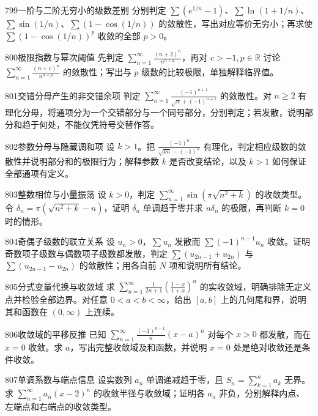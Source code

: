 \begin{exercise}{799}{一阶与二阶无穷小的级数差别}
分别判定 $\sum(e^{1/n}-1)$、$\sum\ln(1+1/n)$、$\sum\sin(1/n)$、$\sum(1-\cos(1/n))$ 的敛散性，写出对应等价无穷小；再求使 $\sum(1-\cos(1/n))^p$ 收敛的全部 $p>0$。
\end{exercise}
\begin{exercise}{800}{极限指数与幂次阈值}
先判定 $\sum_{n=1}^{\infty}\frac{(n+2)^n}{n^{n+2}}$，再对 $c>-1,p\in\mathbb R$ 讨论 $\sum_{n=1}^{\infty}\frac{(n+c)^n}{n^{n+p}}$ 的敛散性；写出与 $p$ 级数的比较极限，单独解释临界值。
\end{exercise}
\begin{exercise}{801}{交错分母产生的非交错余项}
判定 $\sum_{n=1}^{\infty}\frac{(-1)^{n+1}}{\sqrt n+(-1)^{n+1}}$ 的敛散性。对 $n\ge2$ 有理化分母，将通项分为一个交错部分与一个同号部分，分别判定；若发散，说明部分和趋于何处，不能仅凭符号交替作答。
\end{exercise}
\begin{exercise}{802}{参数分母与隐藏调和项}
设 $k>1$。把 $\frac{(-1)^n}{\sqrt{kn}-(-1)^n}$ 有理化，判定相应级数的敛散性并说明部分和的极限行为；解释参数 $k$ 是否改变结论，以及 $k>1$ 如何保证全部通项有定义。
\end{exercise}
\begin{exercise}{803}{整数相位与小量振荡}
设 $k>0$，判定 $\sum_{n=1}^{\infty}\sin(\pi\sqrt{n^2+k})$ 的收敛类型。令 $\delta_n=\pi(\sqrt{n^2+k}-n)$，证明 $\delta_n$ 单调趋于零并求 $n\delta_n$ 的极限，再判断 $k=0$ 时的情形。
\end{exercise}
\begin{exercise}{804}{奇偶子级数的联立关系}
设 $u_n>0$，$\sum u_n$ 发散而 $\sum(-1)^{n-1}u_n$ 收敛。证明奇数项子级数与偶数项子级数都发散，判定 $\sum(u_{2n-1}+u_{2n})$ 与 $\sum(u_{2n-1}-u_{2n})$ 的敛散性；用各自前 $N$ 项和说明所有结论。
\end{exercise}
\begin{exercise}{805}{分式变量代换与收敛域}
求 $\sum_{n=1}^{\infty}\frac1{2n+1}(\frac{1-x}{1+x})^n$ 的实收敛域，明确排除无定义点并检验全部边界。对任意 $0<a<b<\infty$，给出 $[a,b]$ 上的几何尾和界，说明其和函数在 $(0,\infty)$ 上连续。
\end{exercise}
\begin{exercise}{806}{收敛域的平移反推}
已知 $\sum_{n=1}^{\infty}\frac{(-1)^{n-1}}n(x-a)^n$ 对每个 $x>0$ 都发散，而在 $x=0$ 收敛。求 $a$，写出完整收敛域及和函数，并说明 $x=0$ 处是绝对收敛还是条件收敛。
\end{exercise}
\begin{exercise}{807}{单调系数与端点信息}
设实数列 $a_n$ 单调递减趋于零，且 $S_n=\sum_{k=1}^{n}a_k$ 无界。求 $\sum_{n=1}^{\infty}a_n(x-2)^n$ 的收敛半径与收敛域；证明各 $a_n$ 非负，分别解释内点、左端点和右端点的收敛类型。
\end{exercise}

